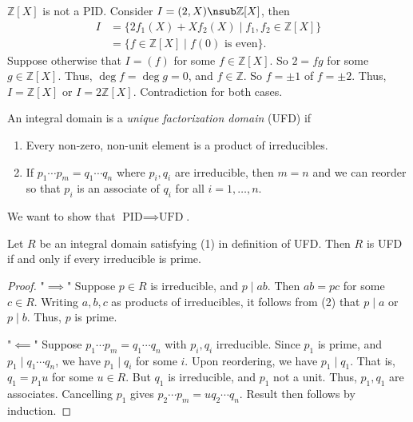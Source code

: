 \begin{example}
    \(\mathbb{Z}[X]\) is not a PID. Consider \(I = (2, X) \nsub \mathbb{Z}[X]\), then
    \begin{align*}
        I &= \{2f_1(X) + X f_2(X) \mid f_1, f_2 \in \mathbb{Z}[X]\}\\
        &=\{f\in \mathbb{Z}[X]\mid f(0)\text{ is even}\}.
    \end{align*}
    Suppose otherwise that \(I = (f)\) for some \(f \in \mathbb{Z}[X]\). So \(2 = fg\) for some \(g \in \mathbb{Z}[X]\). Thus, \(\deg f = \deg g = 0\), and \(f \in \mathbb{Z}\). So \(f = \pm 1\) of \(f = \pm 2\). Thus, \(I = \mathbb{Z}[X]\) or \(I = 2\mathbb{Z}[X]\). Contradiction for both cases.
\end{example}
\begin{definition}
    An integral domain is a \textit{unique factorization domain} (UFD) if
    \begin{enumerate}
        \item Every non-zero, non-unit element is a product of irreducibles.
        \item If \(p_1\cdots p_m = q_1 \cdots q_n\) where \(p_i,q_i\) are irreducible, then \(m = n\) and we can reorder so that \(p_i\) is an associate of \(q_i\) for all \(i = 1, \ldots, n\).
    \end{enumerate}
\end{definition}
We want to show that \(\text{PID}\implies \text{UFD}\).
\begin{proposition}
    \label{udfprime}
    Let \(R\) be an integral domain satisfying (1) in definition of UFD. Then \(R\) is UFD if and only if every irreducible is prime.
\end{proposition}
\begin{proof}
    "\(\implies\)" Suppose \(p \in R\) is irreducible, and \(p \mid ab\). Then \(ab = pc\) for some \(c \in R\). Writing \(a,b,c\) as products of irreducibles, it follows from (2) that \(p \mid a\) or \(p \mid b\). Thus, \(p\) is prime.

    "\(\impliedby\)" Suppose \(p_1\cdots p_m = q_1 \cdots q_n\) with \(p_i, q_i\) irreducible. Since \(p_1\) is prime, and \(p_1 \mid q_1 \cdots q_n\), we have \(p_1 \mid q_i\) for some \(i\). Upon reordering, we have \(p_1 \mid q_1\). That is, \(q_1 = p_1 u\) for some \(u \in R\). But \(q_1\) is irreducible, and \(p_1\) not a unit. Thus, \(p_1, q_1\) are associates. Cancelling \(p_1\) gives \(p_2 \cdots p_m = uq_2 \cdots q_n\). Result then follows by induction.
\end{proof}
